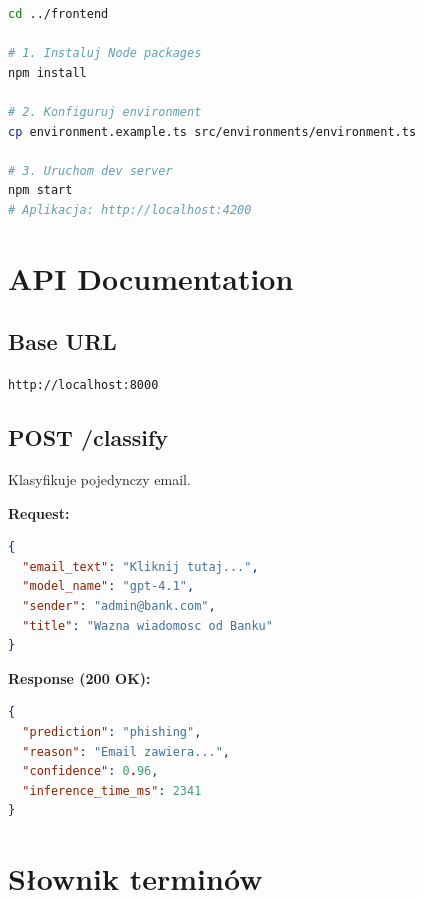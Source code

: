 \documentclass[11pt]{extreport}
\begin{document}
\begin{lstlisting}[language=bash, caption={Instalacja frontendu}]
cd ../frontend

# 1. Instaluj Node packages
npm install

# 2. Konfiguruj environment
cp environment.example.ts src/environments/environment.ts

# 3. Uruchom dev server
npm start
# Aplikacja: http://localhost:4200
\end{lstlisting}

\chapter{API Documentation}
\label{app:api}

\section{Base URL}

\texttt{http://localhost:8000}

\section{POST /classify}

Klasyfikuje pojedynczy email.

\textbf{Request:}
\begin{lstlisting}[language=json]
{
  "email_text": "Kliknij tutaj...",
  "model_name": "gpt-4.1",
  "sender": "admin@bank.com",
  "title": "Wazna wiadomosc od Banku"
}
\end{lstlisting}

\textbf{Response (200 OK):}
\begin{lstlisting}[language=json]
{
  "prediction": "phishing",
  "reason": "Email zawiera...",
  "confidence": 0.96,
  "inference_time_ms": 2341
}
\end{lstlisting}

\chapter{Słownik terminów}
\label{app:slownik}
\end{document}
